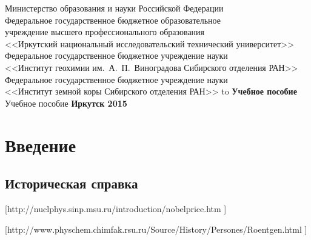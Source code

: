\documentclass[a4paper,14pt, openany, twoside, draft]{extbook} %
\newcommand{\aaa}[2][acolor]{\noindent\textcolor{eclr}%
{+\ [}\textcolor{#1}{#2}\textcolor{eclr}{]}}
\begin{document}

\renewcommand{\refname}{Список использованных источников} %
\renewcommand{\bibname}{\refname}
\begin{titlepage}
\thispagestyle{empty}
\begin{center}{\small{}
Министерство образования и науки
Российской Федерации\\
Федеральное государственное бюджетное образовательное\\
учреждение высшего профессионального образования\\
<<Иркутский национальный исследовательский технический университет>> \\[1ex]
Федеральное государственное бюджетное учреждение науки \\
<<Институт геохимии им.~А.~П.~Виноградова
Сибирского отделения РАН>> \\[1ex]
Федеральное государственное бюджетное учреждение науки \\
<<Институт земной коры Сибирского отделения РАН>>
}
\vfill
\hbox to \linewidth{\hfill\bfseries А.~Л.~Финкельштейн, Т.~Ю.~Черкашина\hfill}
 \vspace{2em}
{\large\bfseries Учебное пособие}\\
\vspace{1em}
{Учебное пособие}
\vfill
\vfill
 \textbf{Иркутск 2015}
\end{center}
\end{titlepage}

\clearpage
\tableofcontents
\clearpage

\chapter{Введение}
\label{cha:intro}

\section{Историческая справка}
\label{sec:history}


[http://nuclphys.sinp.msu.ru/introduction/nobelprice.htm ]

[http://www.physchem.chimfak.rsu.ru/Source/History/Persones/Roentgen.html ]
\end{document}

